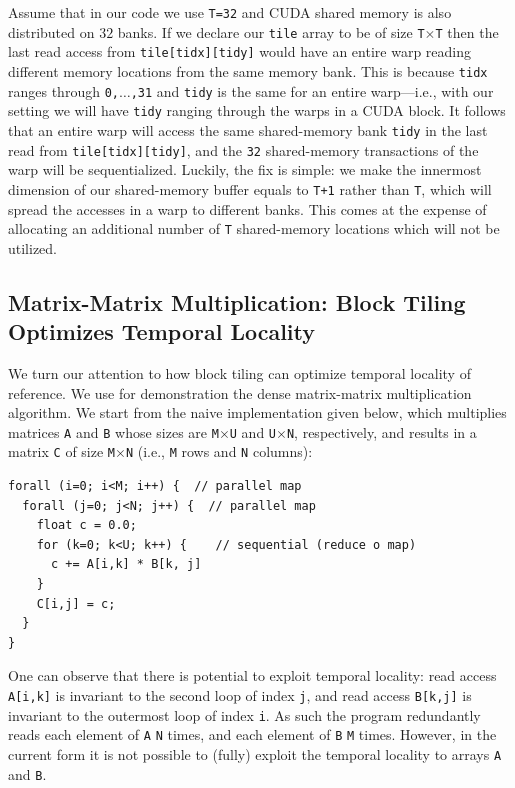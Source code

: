 \documentclass[acmsmall,review]{acmart}\settopmatter{printfolios=true,printccs=false,printacmref=false}
\begin{document}
Assume that in our code we use {\tt T=32} and CUDA shared memory is also 
distributed on $32$ banks. If we declare our {\tt tile} array to be of size
{\tt T$\times$T} then the last read access from {\tt tile[tidx][tidy]} 
would have an entire warp reading different memory locations from the
same memory bank. This is because {\tt tidx} ranges through {\tt 0,$\ldots$,31}
and {\tt tidy} is the same for an entire warp---i.e., with our setting we will
have {\tt tidy} ranging through the warps in a CUDA block. It follows
that an entire warp will access the same shared-memory bank {\tt tidy} 
in the last read from {\tt tile[tidx][tidy]}, and the {\tt 32}
shared-memory transactions of the warp will be sequentialized. 
Luckily, the fix is simple: we make the innermost dimension of our
shared-memory buffer equals to {\tt T+1} rather than {\tt T}, which
will spread the accesses in a warp to different banks. This comes at
the expense of allocating an additional number of {\tt T} shared-memory
locations which will not be utilized.

\subsection{Matrix-Matrix Multiplication: Block Tiling Optimizes Temporal Locality}
\label{subsec:block-mmm}

We turn our attention to how block tiling can optimize temporal locality
of reference. 
We use for demonstration the dense matrix-matrix multiplication 
algorithm.   We start from the naive implementation given below, which
multiplies matrices {\tt A} and {\tt B} whose sizes are {\tt M$\times$U}
and {\tt U$\times$N}, respectively, and results in a matrix {\tt C} of
size {\tt M$\times$N} (i.e., {\tt M} rows and {\tt N} columns):\smallskip

\begin{lstlisting}[mathescape=true]
forall (i=0; i<M; i++) {  // parallel map
  forall (j=0; j<N; j++) {  // parallel map
    float c = 0.0;
    for (k=0; k<U; k++) {    // sequential (reduce o map)
      c += A[i,k] * B[k, j]
    }
    C[i,j] = c;
  } 
}
\end{lstlisting}

One can observe that there is potential to exploit temporal locality:
read access {\tt A[i,k]} is invariant to the second loop of index {\tt j},
and read access {\tt B[k,j]} is invariant to the outermost loop of index 
{\tt i}. As such the program redundantly reads each element of {\tt A}
{\tt N} times, and each element of {\tt B} {\tt M} times. However, in the
current form it is not possible to (fully) exploit the temporal locality 
to arrays {\tt A} and {\tt B}.
\end{document}
